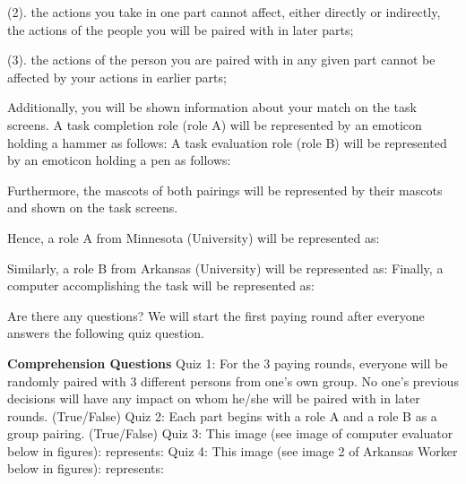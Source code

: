   (2). the actions you take in one part cannot affect, either directly or indirectly, the actions of the people you will be paired with in later parts;
  \newline

  (3). the actions of the person you are paired with in any given part cannot be affected by your actions in earlier parts; 
  \newline

Additionally, you will be shown information about your match on the task screens. 
A task completion role (role A) will be represented by an emoticon holding a hammer as follows:  
A task evaluation role (role B) will be represented by an emoticon holding a pen as follows:  

Furthermore, the mascots of both pairings will be represented by their mascots and shown on the task screens. 

Hence, a role A from Minnesota (University) will be represented as:  

Similarly, a role B from Arkansas (University) will be represented as:  
Finally, a computer accomplishing the task will be represented as:  

Are there any questions?  We will start the first paying round after everyone answers the following quiz question. 

\textbf{Comprehension Questions}
\newline
Quiz 1: For the 3 paying rounds, everyone will be randomly paired with 3 different persons from one’s own group.  No one’s previous decisions will have any impact on whom he/she will be paired with in later rounds. (True/False)
\newline
Quiz 2: Each part begins with a role A and a role B as a group pairing. 
(True/False)
\newline
Quiz 3: This image (see image of computer evaluator below in figures):    represents:
\newline
Quiz 4: This image (see image 2 of Arkansas Worker below in figures):    represents:



